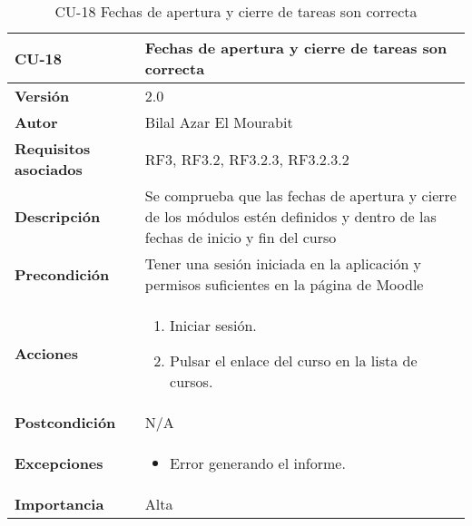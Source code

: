 \begin{table}[H]
	\centering
	\begin{tabularx}{\linewidth}{ p{} p{} }
		\toprule
		\textbf{CU-18}    & \textbf{Fechas de apertura y cierre de tareas son correcta}\\
		\toprule
		\textbf{Versión}              & 2.0    \\
		\textbf{Autor}                & Bilal Azar El Mourabit \\
		\textbf{Requisitos asociados} & RF3, RF3.2, RF3.2.3, RF3.2.3.2 \\
		\textbf{Descripción}          & Se comprueba que las fechas de apertura y cierre de los módulos estén definidos y dentro de las fechas de inicio y fin del curso\\
    		\textbf{Precondición}         & Tener una sesión iniciada en la aplicación y permisos suficientes en la página de Moodle\\
		\textbf{Acciones}             & 
		\begin{enumerate}
			\def\labelenumi{\arabic{enumi}.}
			\tightlist
			\item Iniciar sesión.
            \item Pulsar el enlace del curso en la lista de cursos. 
		\end{enumerate}\\
		\textbf{Postcondición}        & N/A \\
		\textbf{Excepciones}          & \begin{itemize}
		    \item Error generando el informe.
		\end{itemize} \\
		\textbf{Importancia}          & Alta \\
		\bottomrule
	\end{tabularx}
	\caption{CU-18 Fechas de apertura y cierre de tareas son
correcta}
\end{table}

